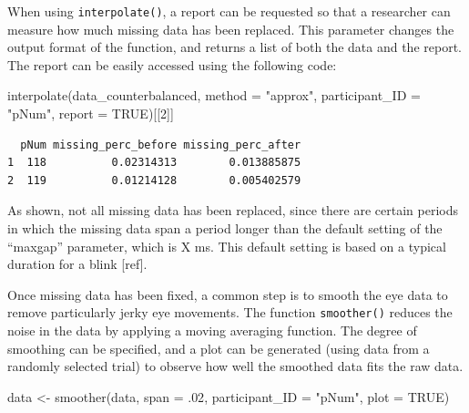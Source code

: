 \documentclass[
  man,
  floatsintext,
  longtable,
  nolmodern,
  notxfonts,
  notimes,
  colorlinks=true,linkcolor=blue,citecolor=blue,urlcolor=blue]{apa7}
\newenvironment{Shaded}{\begin{snugshade}}{\end{snugshade}}
\newcommand{\AttributeTok}[1]{\textcolor[rgb]{0.40,0.45,0.13}{#1}}
\newcommand{\ConstantTok}[1]{\textcolor[rgb]{0.56,0.35,0.01}{#1}}
\newcommand{\DecValTok}[1]{\textcolor[rgb]{0.68,0.00,0.00}{#1}}
\newcommand{\FunctionTok}[1]{\textcolor[rgb]{0.28,0.35,0.67}{#1}}
\newcommand{\NormalTok}[1]{\textcolor[rgb]{0.00,0.23,0.31}{#1}}
\newcommand{\OtherTok}[1]{\textcolor[rgb]{0.00,0.23,0.31}{#1}}
\newcommand{\StringTok}[1]{\textcolor[rgb]{0.13,0.47,0.30}{#1}}
\begin{document}
When using \texttt{interpolate()}, a report can be requested so that a
researcher can measure how much missing data has been replaced. This
parameter changes the output format of the function, and returns a list
of both the data and the report. The report can be easily accessed using
the following code:

\begin{Shaded}
\begin{Highlighting}[]
\FunctionTok{interpolate}\NormalTok{(data\_counterbalanced, }
            \AttributeTok{method =} \StringTok{"approx"}\NormalTok{,}
            \AttributeTok{participant\_ID =} \StringTok{"pNum"}\NormalTok{, }
            \AttributeTok{report =} \ConstantTok{TRUE}\NormalTok{)[[}\DecValTok{2}\NormalTok{]]}
\end{Highlighting}
\end{Shaded}

\begin{verbatim}
  pNum missing_perc_before missing_perc_after
1  118          0.02314313        0.013885875
2  119          0.01214128        0.005402579
\end{verbatim}

As shown, not all missing data has been replaced, since there are
certain periods in which the missing data span a period longer than the
default setting of the ``maxgap'' parameter, which is X ms. This default
setting is based on a typical duration for a blink {[}ref{]}.

Once missing data has been fixed, a common step is to smooth the eye
data to remove particularly jerky eye movements. The function
\texttt{smoother()} reduces the noise in the data by applying a moving
averaging function. The degree of smoothing can be specified, and a plot
can be generated (using data from a randomly selected trial) to observe
how well the smoothed data fits the raw data.

\begin{Shaded}
\begin{Highlighting}[]
\NormalTok{data }\OtherTok{\textless{}{-}} \FunctionTok{smoother}\NormalTok{(data,}
                 \AttributeTok{span =}\NormalTok{ .}\DecValTok{02}\NormalTok{,}
                 \AttributeTok{participant\_ID =} \StringTok{"pNum"}\NormalTok{, }
                 \AttributeTok{plot =} \ConstantTok{TRUE}\NormalTok{)}
\end{Highlighting}
\end{Shaded}
\end{document}
